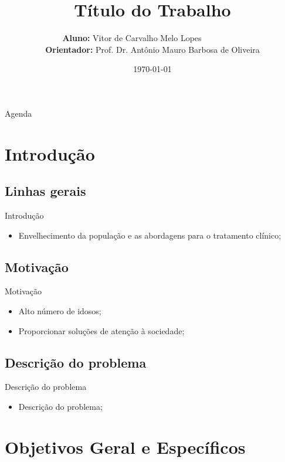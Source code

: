 \documentclass{beamer}
\title[Qualificação]{Título do Trabalho}
\author[Vitor C. M. Lopes]{\textbf{Aluno:} Vitor de Carvalho Melo Lopes~~~~~~~~~~\;\\\textbf{Orientador:} Prof. Dr. Antônio Mauro Barbosa de Oliveira}
\institute[PPGCC/IFCE] %
{%
  Programa de Pós-Graduação em Ciência da Computação (PPGCC)\\
  Instituto Federal de Educação, Ciência e Tecnologia do Ceará (IFCE)  
}
\date{\today}
\begin{document}
\begin{frame}
  \titlepage
\end{frame}

\begin{frame}{Agenda}
  \tableofcontents[hideothersubsections]
\end{frame}


\section{Introdução}

\subsection{Linhas gerais}
\begin{frame}{Introdução}
  \begin{itemize}
    \item \Large Envelhecimento da população e as abordagens para o tratamento
    clínico;
  \end{itemize}
\end{frame}

\subsection{Motivação}
\begin{frame}{Motivação}
  \begin{itemize}
    \item \Large Alto número de idosos;
    \item \Large Proporcionar soluções de atenção à sociedade;
  \end{itemize}
\end{frame}

\subsection{Descrição do problema}
\begin{frame}{Descrição do problema}
  \begin{itemize}
    \item Descrição do problema;
  \end{itemize}
\end{frame}

\section{Objetivos Geral e Específicos}
\end{document}
